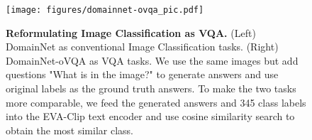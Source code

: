 \begin{figure}[!h]
     \centering
     \texttt{[image: figures/domainnet-ovqa\_pic.pdf]}
     \caption{\textbf{Reformulating Image Classification as VQA.} (Left) DomainNet as conventional Image Classification tasks. (Right) DomainNet-oVQA as VQA tasks. We use the same images but add questions "What is in the image?" to generate answers and use original labels as the ground truth answers. To make the two tasks more comparable, we feed the generated answers and 345 class labels into the EVA-Clip text encoder and use cosine similarity search to obtain the most similar class.}
     \label{fig:domainnet-ovqa}
\end{figure}